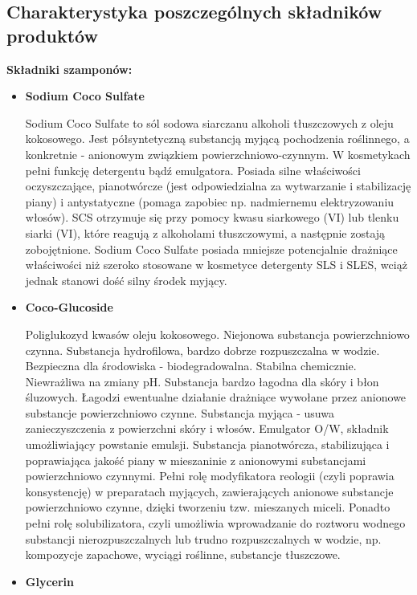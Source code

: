 \subsection{Charakterystyka poszczególnych składników produktów}

\textbf{Składniki szamponów:}

\begin{itemize}
\item \textbf{Sodium Coco Sulfate}

Sodium Coco Sulfate to sól sodowa siarczanu alkoholi tłuszczowych z oleju kokosowego. Jest półsyntetyczną substancją myjącą pochodzenia roślinnego, a konkretnie - anionowym związkiem powierzchniowo-czynnym. W kosmetykach pełni funkcję detergentu bądź emulgatora. Posiada silne właściwości oczyszczające, pianotwórcze (jest odpowiedzialna za wytwarzanie i stabilizację piany) i antystatyczne (pomaga zapobiec np. nadmiernemu elektryzowaniu włosów). SCS otrzymuje się przy pomocy kwasu siarkowego (VI) lub tlenku siarki (VI), które reagują z alkoholami tłuszczowymi, a następnie zostają zobojętnione. Sodium Coco Sulfate posiada mniejsze potencjalnie drażniące właściwości niż szeroko stosowane w kosmetyce detergenty SLS i SLES, wciąż jednak stanowi dość silny środek myjący.

\item \textbf{Coco-Glucoside}

Poliglukozyd kwasów oleju kokosowego. Niejonowa substancja powierzchniowo czynna. Substancja hydrofilowa, bardzo dobrze rozpuszczalna w wodzie. Bezpieczna dla środowiska - biodegradowalna. Stabilna chemicznie. Niewrażliwa na zmiany pH. Substancja bardzo łagodna dla skóry i błon śluzowych. Łagodzi ewentualne działanie drażniące wywołane przez anionowe substancje powierzchniowo czynne. Substancja myjąca - usuwa zanieczyszczenia z powierzchni skóry i włosów. Emulgator O/W, składnik umożliwiający powstanie emulsji. Substancja pianotwórcza, stabilizująca i poprawiająca jakość piany w mieszaninie z anionowymi substancjami powierzchniowo czynnymi. Pełni rolę modyfikatora reologii (czyli poprawia konsystencję) w preparatach myjących, zawierających anionowe substancje powierzchniowo czynne, dzięki tworzeniu tzw. mieszanych miceli. Ponadto pełni rolę solubilizatora, czyli umożliwia wprowadzanie do roztworu wodnego substancji nierozpuszczalnych lub trudno rozpuszczalnych w wodzie, np. kompozycje zapachowe, wyciągi roślinne, substancje tłuszczowe.

\item \textbf{Glycerin}


\end{itemize}

